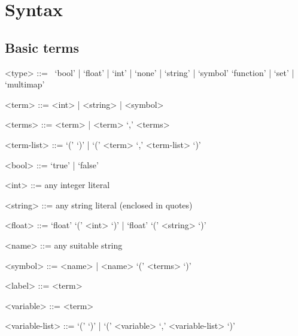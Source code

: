 \section{Syntax}

\subsection{Basic terms}
\begin{grammar}

<type> ::=
~\alt `bool' | `float' | `int' | `none' | `string' | `symbol'
\alt `function' | `set' | `multimap'

<term> ::= <int> | <string> | <symbol>

<terms> ::= <term> | <term> `,' <terms>

<term-list> ::= `(' `)' | `(' <term> `,' <term-list> `)'

<bool> ::= `true' | `false'

<int> ::= any integer literal

<string> ::= any string literal (enclosed in quotes)

<float> ::= `float' `(' <int> `)' | `float' `(' <string> `)'

<name> ::= any suitable string

<symbol> ::= <name> | <name> `(' <terms> `)'

<label> ::= <term>

<variable> ::= <term>

<variable-list> ::= `(' `)' | `(' <variable> `,' <variable-list> `)'


\end{grammar}

